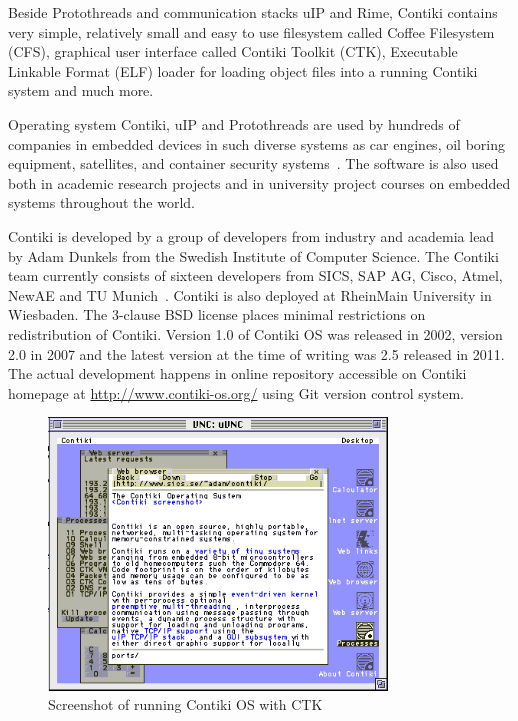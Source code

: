Beside Protothreads and communication stacks uIP and Rime,
Contiki contains very simple, relatively small and easy to use filesystem
called Coffee Filesystem (CFS),
graphical user interface called Contiki Toolkit (CTK),
Executable Linkable Format (ELF) loader for loading object files into a running Contiki system
and much more.

Operating system Contiki, uIP and Protothreads are used by hundreds of companies in embedded devices in
such diverse systems as car engines, oil boring equipment, satellites, and container security systems~\cite{thesis-programming}.
The software is also used both in academic research
projects and in university project courses on embedded systems throughout the
world.

Contiki is developed by a group of developers from industry and academia
lead by Adam Dunkels from the Swedish Institute of Computer Science.
The Contiki team currently consists of sixteen developers from SICS,
SAP AG, Cisco, Atmel, NewAE and TU Munich~\cite{contiki-docs}.
Contiki is also deployed at RheinMain University in Wiesbaden.
The 3-clause BSD license places minimal restrictions on redistribution of Contiki.
Version 1.0 of Contiki OS was released in 2002, version 2.0 in 2007 and the latest version
at the time of writing was 2.5 released in 2011.
The actual development happens in online repository accessible on Contiki homepage at \url{http://www.contiki-os.org/}
using Git version control system.

\begin{figure}
  \centering
  \includegraphics[width=9cm,keepaspectratio]{fig/contiki-vnc.png}
  \caption{Screenshot of running Contiki OS with CTK}
  \label{fig:contiki}
  \bigskip
\end{figure}









